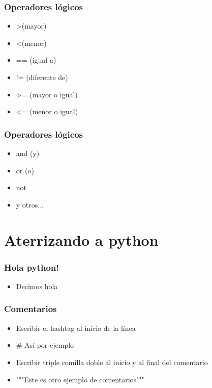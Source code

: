 \documentclass[hyperref={pdfpagelabels=false},xcolor=pst,pdf,fragile]{beamer}
\begin{document}
\begin{frame}
    \frametitle{Operadores lógicos}
    \pause
    \begin{itemize}
    \item \textgreater (mayor)
    \item \textless (menor)
    \item == (igual a)
    \item != (diferente de)
    \item \textgreater= (mayor o igual)
    \item \textless= (menor o igual)
    \end{itemize}
\end{frame}

\begin{frame}
    \frametitle{Operadores lógicos}
    \begin{itemize}
    \item and (y)
    \item or (o)
    \item not
    \item y otros...
    \end{itemize}
\end{frame}

\section{Aterrizando a python}
\begin{frame}
    \frametitle{Hola python!}
    \pause
    \begin{itemize}
    \item Decimos hola
    \end{itemize}
\end{frame}

\begin{frame}
    \frametitle{Comentarios}
    \pause
    \begin{itemize}
    \item Escribir el hashtag al inicio de la línea
    \item \# Así por ejemplo
    \item Escribir triple comilla doble al inicio y al final del comentario
    \item """Este es otro ejemplo de comentarios"""
    \end{itemize}
\end{frame}
\end{document}
